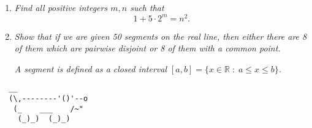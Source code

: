 \documentclass{article}
\begin{document}
\begin{enumerate}
\item %
\textit{Find all positive integers $m, n$ such that \[ 1 + 5 \cdot 2^m = n^2. \]}




\vspace{12pt}
\item %
\textit{Show that if we are given 50 segments on the real line, then either there are 8 of them which are pairwise disjoint or 8 of them with a common point.}

\textit{A segment is defined as a closed interval $[a, b] = \{x \in \mathbb{R} \;:\; a \leq x \leq b \}$.}




\end{enumerate}


\vspace{12pt}
\begin{center}
\begin{BVerbatim}
  __
  (\,--------'()'--o
   (_    ___    /~"
    (_)_)  (_)_)
\end{BVerbatim}
\end{center}
\end{document}
